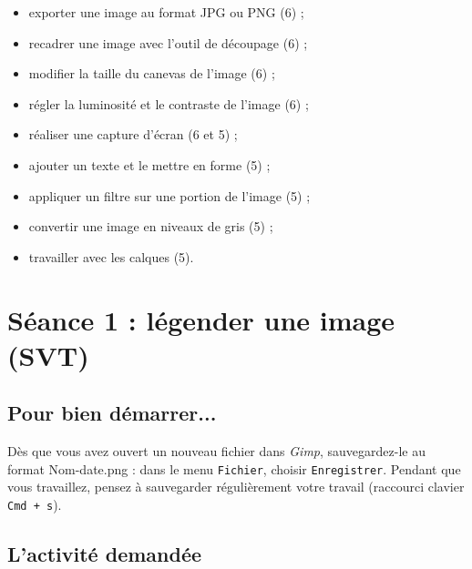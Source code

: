 \begin{itemize}
\item exporter une image au format JPG ou PNG (6) ;
\item recadrer une image avec l'outil de découpage (6) ;
\item modifier la taille du canevas de l'image (6) ;
\item régler la luminosité et le contraste de l'image (6) ;
\item réaliser une capture d'écran (6 et 5) ;
\item ajouter un texte et le mettre en forme (5) ;
\item appliquer un filtre sur une portion de l'image (5) ;
\item convertir une image en niveaux de gris (5) ;
\item travailler avec les calques (5). 
\end{itemize}





%
%
%
%


\pagebreak

\section{Séance 1 : légender une image (SVT)}\label{ficheImage4e2}

\subsection{Pour bien démarrer...}

Dès que vous avez ouvert un nouveau fichier dans \emph{Gimp}, sauvegardez-le au format Nom-date.png : dans le menu \texttt{Fichier}, choisir \texttt{Enregistrer}. Pendant que vous travaillez, pensez à sauvegarder régulièrement votre travail (raccourci clavier \texttt{Cmd + s}).   



\subsection{L'activité demandée}

\vspace{10pt}

